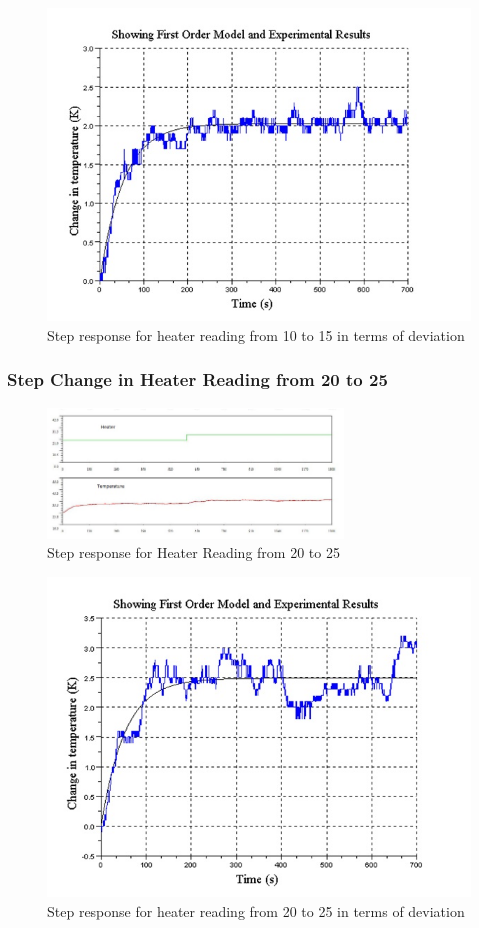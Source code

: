 	
	
\begin{figure}[h]
\centering
	\includegraphics[width = .75\textwidth]{Vikas_self/report_tex/parameter_estimation/optimized10to15.jpg}
		\caption{Step response for heater reading from 10 to 15 in terms of deviation}
	\label{optimized10to15}
\end{figure}

\newpage
\subsubsection{Step Change in Heater Reading from 20 to 25}
\begin{figure}[h]
\centering
	\includegraphics[width = 0.7\textwidth]{Vikas_self/report_tex/parameter_estimation/20to25.jpg}
		\caption{Step response for Heater Reading from 20 to 25}
	\label{fig:20to25}
\end{figure}
%
\begin{figure}[h]
\centering
	\includegraphics[width = .7\textwidth]{Vikas_self/report_tex/parameter_estimation/optimized20to25.jpg}
		\caption{Step response for heater reading from 20 to 25 in terms of deviation}
	\label{optimized20to25}
\end{figure}
\newpage
